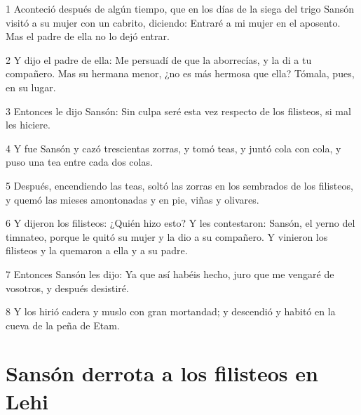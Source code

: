 \par 1 Aconteció después de algún tiempo, que en los días de la siega del trigo Sansón visitó a su mujer con un cabrito, diciendo: Entraré a mi mujer en el aposento. Mas el padre de ella no lo dejó entrar.
\par 2 Y dijo el padre de ella: Me persuadí de que la aborrecías, y la di a tu compañero. Mas su hermana menor, ¿no es más hermosa que ella? Tómala, pues, en su lugar.
\par 3 Entonces le dijo Sansón: Sin culpa seré esta vez respecto de los filisteos, si mal les hiciere.
\par 4 Y fue Sansón y cazó trescientas zorras, y tomó teas, y juntó cola con cola, y puso una tea entre cada dos colas.
\par 5 Después, encendiendo las teas, soltó las zorras en los sembrados de los filisteos, y quemó las mieses amontonadas y en pie, viñas y olivares.
\par 6 Y dijeron los filisteos: ¿Quién hizo esto? Y les contestaron: Sansón, el yerno del timnateo, porque le quitó su mujer y la dio a su compañero. Y vinieron los filisteos y la quemaron a ella y a su padre.
\par 7 Entonces Sansón les dijo: Ya que así habéis hecho, juro que me vengaré de vosotros, y después desistiré.
\par 8 Y los hirió cadera y muslo con gran mortandad; y descendió y habitó en la cueva de la peña de Etam.

\section*{Sansón derrota a los filisteos en Lehi}


